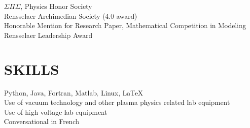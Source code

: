 \documentclass[margin]{rpires}
\begin{document}
\begin{resume}
$\Sigma \Pi \Sigma$, Physics Honor Society \\
Rensselaer Archimedian Society (4.0 award) \\
Honorable Mention for Research Paper,       Mathematical Competition in Modeling \\
Rensselaer Leadership Award 
 
\section{SKILLS}
Python, Java, Fortran, Matlab, Linux, \LaTeX\\
Use of vacuum technology and other plasma physics related lab equipment\\
Use of high voltage lab equipment\\
Conversational in French\\%

 
 
\end{resume} 
\end{document}
